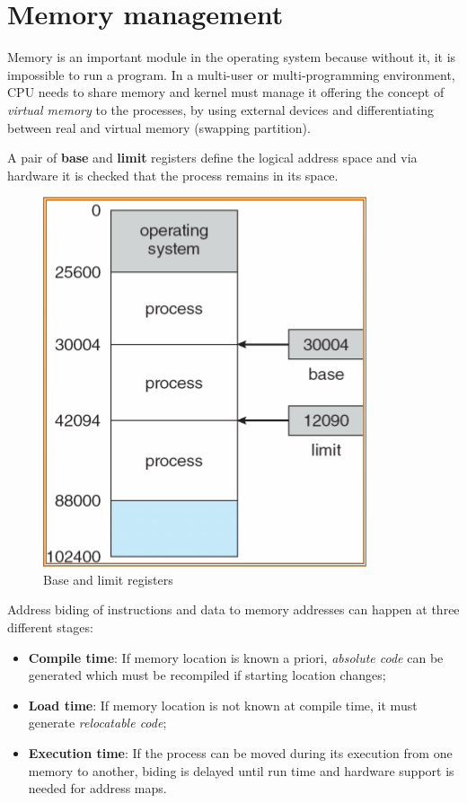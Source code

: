 \chapter{Memory management}
Memory is an important module in the operating system because without it, it is impossible to run a program. In a multi-user or multi-programming environment, CPU needs to share memory and kernel must manage it offering the concept of \emph{virtual memory} to the processes, by using external devices and differentiating between real and virtual memory (swapping partition).

A pair of \textbf{base} and \textbf{limit} registers define the logical address space and via hardware it is checked that the process remains in its space.

\begin{figure}[hbtp]
\centering
\includegraphics[scale=0.4]{images/memory_management/base_limit_regs.jpg}
\caption{Base and limit registers}
\end{figure}

Address biding of instructions and data to memory addresses can happen at three different stages:
\begin{itemize}
\item \textbf{Compile time}: If memory location is known a priori, \emph{absolute code} can be generated which must be recompiled if starting location changes;
\item \textbf{Load time}: If memory location is not known at compile time, it must generate \emph{relocatable code};
\item \textbf{Execution time}: If the process can be moved during its execution from one memory to another, biding is delayed until run time and hardware support is needed for address maps.
\end{itemize}

